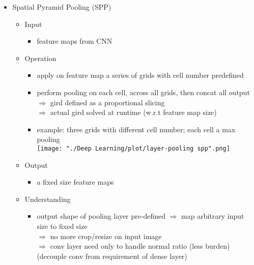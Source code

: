\begin{itemize}
\item Spatial Pyramid Pooling (SPP)
	\begin{itemize}
	\item Input
		\begin{itemize}
		\item feature maps from CNN
		\end{itemize}
	\item Operation
		\begin{itemize}
		\item apply on feature map a series of grids with cell number predefined
		\item perform pooling on each cell, across all grids, then concat all output \\
		$\Rightarrow$ gird defined as a proportional slicing \\
		$\Rightarrow$ actual gird solved at runtime (w.r.t feature map size)
		\item example: three grids with different cell number; each cell a max pooling \\
		\texttt{[image: "./Deep Learning/plot/layer-pooling spp".png]}
		\end{itemize}
	\item Output
		\begin{itemize}
		\item a fixed size feature maps
		\end{itemize}
	\item Understanding
		\begin{itemize}
		\item output shape of pooling layer pre-defined $\Rightarrow$ map arbitrary input size to fixed size \\
		$\Rightarrow$ no more crop/resize on input image \\
		$\Rightarrow$ conv layer need only to handle normal ratio (less burden) \\
		(decouple conv from requirement of dense layer)
		\end{itemize}
	\end{itemize}
	

\end{itemize}
